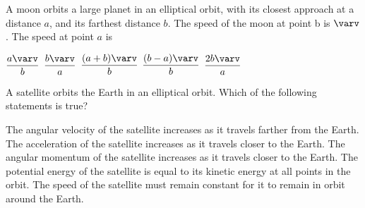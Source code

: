 \documentclass{../../../oss-classkick-exam}
\begin{document}
\begin{multicols*}{2}
\begin{questions}
    \question A moon orbits a large planet in an elliptical orbit, with its
    closest approach at a distance $a$, and its farthest distance $b$. The
    speed of the moon at point b is $\varv$. The speed at point $a$ is
    \begin{choices}
      \choice $\dfrac{a\varv}{b}$
      \choice $\dfrac{b\varv}{a}$
      \choice $\dfrac{(a+b)\varv}{b}$
      \choice $\dfrac{(b-a)\varv}{b}$
      \choice $\dfrac{2b\varv}{a}$
    \end{choices}

    \question A satellite orbits the Earth in an elliptical orbit. Which of the
    following statements is true?
    \begin{choices}
      \choice The angular velocity of the satellite increases as it travels
      farther from the Earth.
      \choice The acceleration of the satellite increases as it travels closer
      to the Earth.
      \choice The angular momentum of the satellite increases as it travels
      closer to the Earth.
      \choice The potential energy of the satellite is equal to its kinetic
      energy at all points in the orbit.
      \choice The speed of the satellite must remain constant for it to remain
      in orbit around the Earth.
    \end{choices}
    \vspace{.7in}
    
    \columnbreak

\end{questions}
\end{multicols*}
\end{document}
